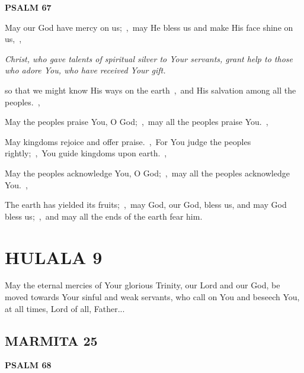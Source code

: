 \documentclass[12pt,twoside,a5paper]{article}
\newcommand{\hulala}[1]{\section*{HULALA {#1}}}
\newcommand{\marmita}[1]{\subsection*{MARMITA {#1}}}
\newcommand{\psalm}[1]{\textbf{PSALM {#1}}\nopagebreak}
\newcommand{\qanona}[1]{{\liturgicalhint{Qanona.} \emph{#1}}}
\newcommand{\slota}[1]{\liturgicalhint{Slota.} #1}
\begin{document}
\psalm{67}

\begin{normalparskip}
  May our God have mercy on us;~\sep\ may He bless us and make His face shine on us,~\sep

  \qanona{Christ, who gave talents of spiritual silver to Your servants, grant help to those who adore You, who have received Your gift.}

  so that we might know His ways on the earth~\sep\ and His salvation among all the peoples.~\sep

  May the peoples praise You, O God;~\sep\ may all the peoples praise You.~\sep

  May kingdoms rejoice and offer praise.~\sep\ For You judge the peoples rightly;~\sep\ You guide kingdoms upon earth.~\sep

  May the peoples acknowledge You, O God;~\sep\ may all the peoples acknowledge You.~\sep

  The earth has yielded its fruits;~\sep\ may God, our God, bless us, and may God bless us;~\sep\ and may all the ends of the earth fear him.
\end{normalparskip}


\hulala{9}

\slota{May the eternal mercies of Your glorious Trinity, our Lord and our God, be moved towards Your sinful and weak servants, who call on You and beseech You, at all times, Lord of all, Father...}

\marmita{25}

\psalm{68}
\end{document}
